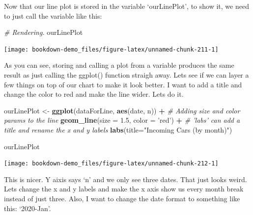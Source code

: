 \documentclass[]{book}
\newenvironment{Shaded}{\begin{snugshade}}{\end{snugshade}}
\newcommand{\CommentTok}[1]{\textcolor[rgb]{0.56,0.35,0.01}{\textit{#1}}}
\newcommand{\DataTypeTok}[1]{\textcolor[rgb]{0.13,0.29,0.53}{#1}}
\newcommand{\FloatTok}[1]{\textcolor[rgb]{0.00,0.00,0.81}{#1}}
\newcommand{\KeywordTok}[1]{\textcolor[rgb]{0.13,0.29,0.53}{\textbf{#1}}}
\newcommand{\NormalTok}[1]{#1}
\newcommand{\OperatorTok}[1]{\textcolor[rgb]{0.81,0.36,0.00}{\textbf{#1}}}
\newcommand{\StringTok}[1]{\textcolor[rgb]{0.31,0.60,0.02}{#1}}
\begin{document}
Now that our line plot is stored in the variable `ourLinePlot', to show it, we need to just call the variable like this:

\begin{Shaded}
\begin{Highlighting}[]
\CommentTok{# Rendering.}
\NormalTok{ourLinePlot}
\end{Highlighting}
\end{Shaded}

\begin{center}\texttt{[image: bookdown-demo\_files/figure-latex/unnamed-chunk-211-1]} \end{center}

As you can see, storing and calling a plot from a variable produces the same result as just calling the ggplot() function straigh away. Lets see if we can layer a few things on top of our chart to make it look better. I want to add a title and change the color to red and make the line wider. Lets do it.

\begin{Shaded}
\begin{Highlighting}[]
\NormalTok{ourLinePlot <-}\StringTok{ }\KeywordTok{ggplot}\NormalTok{(dataForLine, }\KeywordTok{aes}\NormalTok{(date, n)) }\OperatorTok{+}
\StringTok{  }\CommentTok{# Adding size and color params to the line}
\StringTok{  }\KeywordTok{geom_line}\NormalTok{(}\DataTypeTok{size =} \FloatTok{1.5}\NormalTok{, }\DataTypeTok{color =} \StringTok{'red'}\NormalTok{) }\OperatorTok{+}
\StringTok{  }\CommentTok{# 'labs' can add a title and rename the x and y labels}
\StringTok{  }\KeywordTok{labs}\NormalTok{(}\DataTypeTok{title=}\StringTok{"Incoming Cars (by month)"}\NormalTok{)}

\NormalTok{ourLinePlot}
\end{Highlighting}
\end{Shaded}

\begin{center}\texttt{[image: bookdown-demo\_files/figure-latex/unnamed-chunk-212-1]} \end{center}

This is nicer. Y aixis says `n' and we only see three dates. That just looks weird. Lets change the x and y labels and make the x axis show us every month break instead of just three. Also, I want to change the date format to something like this: `2020-Jan'.
\end{document}
